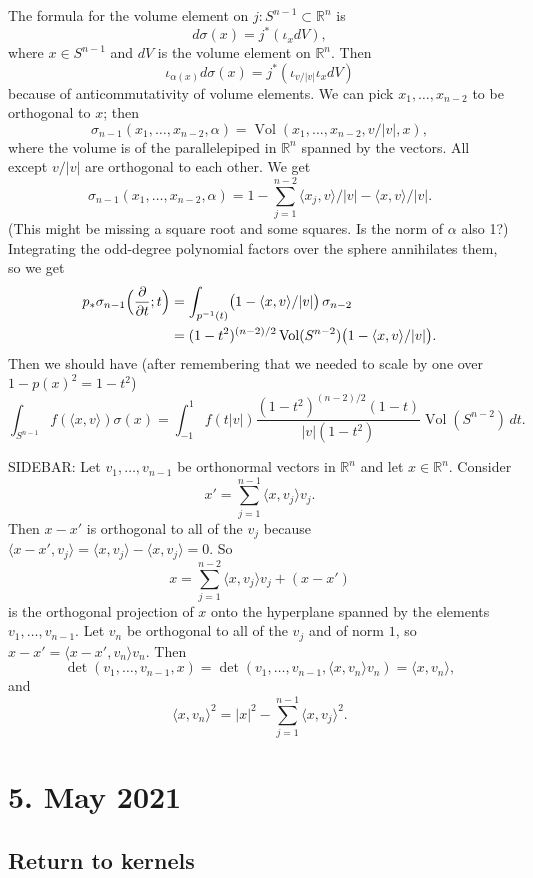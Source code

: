 \documentclass[11pt]{amsart}
\theoremstyle{definition}
\newcommand{\kk}[1]{\mathbb{#1}}
\DeclareMathOperator{\Vol}{Vol}
\begin{document}
The formula for the volume element on $j : S^{n-1} \subset \kk R^n$ is
\[
d\sigma(x) = j^*(\iota_x dV),
\]
where $x \in S^{n-1}$ and $dV$ is the volume element on $\kk R^n$. Then
\[
\iota_{\alpha(x)} d\sigma(x)
= j^*(\iota_{v/|v|} \iota_x dV)
\]
because of anticommutativity of volume elements.
We can pick $x_1,\ldots,x_{n-2}$ to be orthogonal to $x$; then
\[
\sigma_{n-1}(x_1,\ldots,x_{n-2},\alpha)
= \Vol(x_1,\ldots,x_{n-2},v/|v|,x),
\]
where the volume is of the parallelepiped in $\kk R^n$ spanned by the vectors. All except $v/|v|$ are orthogonal to each other. We get
\[
\sigma_{n-1}(x_1,\ldots,x_{n-2},\alpha)
= 1 - \sum_{j=1}^{n-2} \langle x_j, v \rangle / |v| - \langle x, v \rangle / |v|.
\]
(This might be missing a square root and some squares. Is the norm of $\alpha$ also 1?)
Integrating the odd-degree polynomial factors over the sphere annihilates them, so we get
\begin{align*}
p_* \sigma_{n-1}\Bigl(\frac{\partial}{\partial t}; t \Bigr)
&= \int_{p^{-1}(t)} \bigl(1 - \langle x, v \rangle / |v| \bigr) \, \sigma_{n-2}
\\
  &= (1-t^2)^{(n-2)/2} \Vol(S^{n-2}) \bigl(1 - \langle x, v \rangle / |v| \bigr).
\end{align*}
Then we should have (after remembering that we needed to scale by one over $1-p(x)^2 = 1-t^2$)
\[
\int_{S^{n-1}} f(\langle x, v \rangle) \sigma(x)
= \int_{-1}^1 f(t|v|) \frac{(1-t^2)^{(n-2)/2} (1 - t)}{|v| (1-t^2)} \Vol(S^{n-2}) \, dt.
\]


SIDEBAR: Let $v_1,\ldots,v_{n-1}$ be orthonormal vectors in $\kk R^n$ and let $x \in \kk R^n$. Consider
\[
x' = \sum_{j=1}^{n-1} \langle x, v_j \rangle v_j.
\]
Then $x - x'$ is orthogonal to all of the $v_j$ because $\langle x - x', v_j \rangle = \langle x, v_j \rangle - \langle x, v_j \rangle = 0$. So
\[
x = \sum_{j=1}^{n-2} \langle x, v_j \rangle v_j + (x - x')
\]
is the orthogonal projection of $x$ onto the hyperplane spanned by
the elements $v_1,\ldots,v_{n-1}$.
Let $v_n$ be orthogonal to all of the $v_j$ and of norm
$1$, so $x - x' = \langle x - x', v_n \rangle v_n$. Then
\[
\det(v_1,\ldots,v_{n-1}, x)
= \det(v_1,\ldots,v_{n-1}, \langle x, v_n \rangle v_n)
= \langle x, v_n \rangle,
\]
and
\[
\langle x, v_n \rangle^2
= |x|^2 - \sum_{j=1}^{n-1} \langle x, v_j \rangle^2.
\]




\section*{5. May 2021}
\subsection*{Return to kernels}
\end{document}
